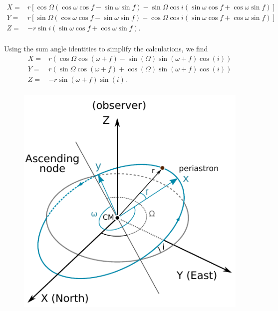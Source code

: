 \documentclass[modern]{aastex62}
\begin{document}
\begin{equation}
  \begin{array}{lc}
    X =& r [ \cos \Omega (\cos \omega \cos f - \sin \omega \sin f)  - \sin \Omega  \cos i (\sin \omega \cos f + \cos \omega \sin f) ] \\
    Y =& r [ \sin \Omega (\cos \omega \cos f - \sin \omega \sin f) + \cos \Omega \cos i(\sin \omega \cos f + \cos \omega \sin f) ] \\
    Z =& - r \sin i (\sin \omega \cos f + \cos \omega \sin f).\\
\end{array}
\label{eqn:Z}
\end{equation}


Using the sum angle identities to simplify the calculations, we find
\begin{equation}
  \begin{array}{lc}
    X =& r (\cos \Omega \cos(\omega + f) - \sin(\Omega) \sin(\omega + f) \cos(i)) \\
    Y =& r (\sin \Omega \cos(\omega + f) + \cos(\Omega) \sin(\omega + f) \cos(i)) \\
    Z =& - r \sin(\omega + f) \sin(i).\\
\end{array}
\label{eqn:Z}
\end{equation}


\begin{figure}[htbp]
\begin{centering}
\includegraphics{figures/orbit3D.pdf}
\end{centering}
\end{figure}
\end{document}
